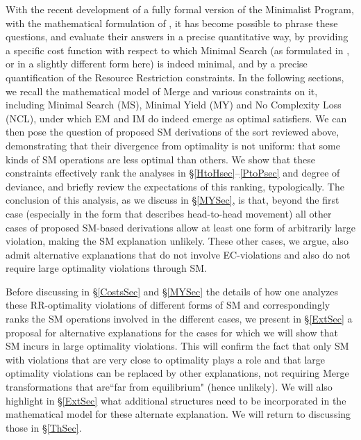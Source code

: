 \documentclass[12pt]{amsart}
\numberwithin{equation}{section}
\begin{document}
With the recent development of a fully formal version of the Minimalist Program, with the 
mathematical formulation of \cite{MCB}, it has become possible to phrase these questions, 
and evaluate their answers in a precise quantitative way, by
providing a specific cost function with respect to which Minimal Search (as formulated
in \cite{ChomskyElements}, or in a slightly different form here) is indeed minimal, and by a precise quantification of the
Resource Restriction constraints. In the following sections, we recall 
the mathematical model of Merge and various constraints on it, including Minimal Search (MS), 
Minimal Yield (MY) and No Complexity Loss (NCL), under which EM and IM do indeed emerge 
as optimal satisfiers. We can then pose the question of proposed SM derivations of the sort reviewed above, 
demonstrating that their divergence from optimality is not uniform: that some kinds of SM 
operations are less optimal than others. We show that these constraints effectively rank 
the analyses in \S \ref{HtoHsec}--\ref{PtoPsec} and degree of deviance, and briefly 
review the expectations of this ranking, typologically.  The conclusion of this
analysis, as we discuss in \S \ref{MYSec}, is that, beyond the first case (especially in the form that
describes head-to-head movement) all other cases of proposed SM-based
derivations allow at least one form of arbitrarily large
violation, making the SM explanation unlikely.  These other cases, we argue, also
admit alternative explanations that do not involve EC-violations and also do not
require large optimality violations through SM.

\smallskip

Before discussing in \S \ref{CostsSec} and \S \ref{MYSec} the details
of how one analyzes these RR-optimality violations of different forms of SM and correspondingly
ranks the SM operations involved in the different cases, 
we present in \S \ref{ExtSec}  a proposal for
alternative explanations for the cases for which we will show that SM incurs in large optimality
violations. This will confirm the fact that only SM with violations that are very close to optimality plays
a role and that large optimality violations can be replaced by other explanations, not requiring
Merge transformations that are``far from equilibrium" (hence unlikely). 
We will also highlight in \S \ref{ExtSec}  what additional structures need to be incorporated in the
mathematical model for these alternate explanation. We will return to discussing those in \S \ref{ThSec}. 


\medskip
\end{document}
